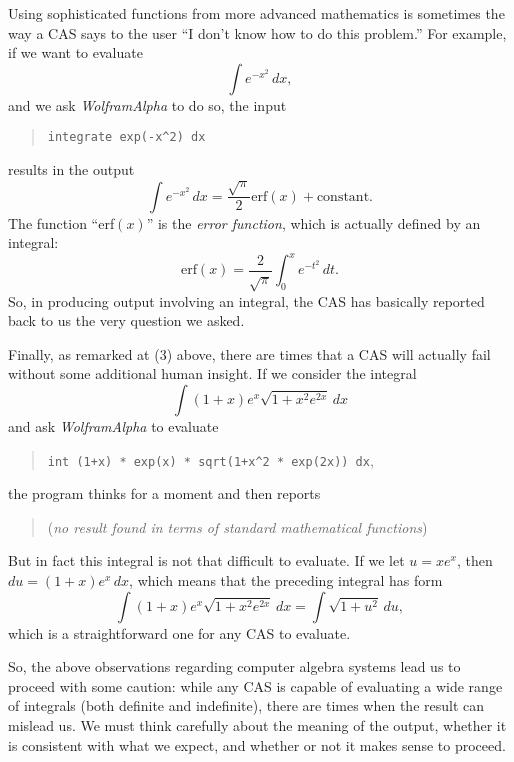 Using sophisticated functions from more advanced mathematics is sometimes the way a CAS says to the user ``I don't know how to do this problem.''  For example, if we want to evaluate 
$$\int e^{-x^2} \, dx,$$
and we ask \emph{WolframAlpha} to do so, the input
\begin{quote}
\texttt{integrate exp(-x\^{}2) dx}
\end{quote} 
results in the output
$$\int e^{-x^2} \, dx = \frac{\sqrt{\pi}}{2}\mbox{erf}(x) + \mbox{constant}.$$
The function ``erf$(x)$'' is the \emph{error function}, which is actually defined by an integral:
$$\mbox{erf}(x) = \frac{2}{\sqrt{\pi}} \int_0^x e^{-t^2} \, dt.$$
So, in producing output involving an integral, the CAS has basically reported back to us the very question we asked.

Finally, as remarked at (3) above, there are times that a CAS will actually fail without some additional human insight.  If we consider the integral
$$\int (1+x)e^x \sqrt{1+x^2e^{2x}} \, dx $$
and ask \emph{WolframAlpha} to evaluate
\begin{quote}
\texttt{int (1+x) * exp(x) * sqrt(1+x\^{}2 * exp(2x)) dx},
\end{quote}
the program thinks for a moment and then reports
\begin{quote}
(\emph{no result found in terms of standard mathematical functions})
\end{quote}
But in fact this integral is not that difficult to evaluate.  If we let $u = xe^{x}$, then $du = (1+x)e^x \, dx$, which means that the preceding integral has form
$$\int (1+x)e^x \sqrt{1+x^2e^{2x}} \, dx = \int \sqrt{1+u^2} \, du, $$
which is a straightforward one for any CAS to evaluate.

So, the above observations regarding computer algebra systems lead us to proceed with some caution:  while any CAS is capable of evaluating a wide range of integrals (both definite and indefinite), there are times when the result can mislead us.  We must think carefully about the meaning of the output, whether it is consistent with what we expect, and whether or not it makes sense to proceed.

%

